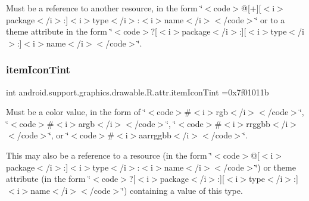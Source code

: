 Must be a reference to another resource, in the form \char`\"{}$<$code$>$@\mbox{[}+\mbox{]}\mbox{[}$<$i$>$package$<$/i$>$\+:\mbox{]}$<$i$>$type$<$/i$>$\+:$<$i$>$name$<$/i$>$$<$/code$>$\char`\"{} or to a theme attribute in the form \char`\"{}$<$code$>$?\mbox{[}$<$i$>$package$<$/i$>$\+:\mbox{]}\mbox{[}$<$i$>$type$<$/i$>$\+:\mbox{]}$<$i$>$name$<$/i$>$$<$/code$>$\char`\"{}. \mbox{\label{classandroid_1_1support_1_1graphics_1_1drawable_1_1R_1_1attr_a09810cf691cdb1d0ea29a12e2f0de04a}} 
\subsubsection{\texorpdfstring{item\+Icon\+Tint}{itemIconTint}}
{\footnotesize\ttfamily int android.\+support.\+graphics.\+drawable.\+R.\+attr.\+item\+Icon\+Tint =0x7f01011b\hspace{0.3cm}{\ttfamily [static]}}

Must be a color value, in the form of \char`\"{}$<$code$>$\#$<$i$>$rgb$<$/i$>$$<$/code$>$\char`\"{}, \char`\"{}$<$code$>$\#$<$i$>$argb$<$/i$>$$<$/code$>$\char`\"{}, \char`\"{}$<$code$>$\#$<$i$>$rrggbb$<$/i$>$$<$/code$>$\char`\"{}, or \char`\"{}$<$code$>$\#$<$i$>$aarrggbb$<$/i$>$$<$/code$>$\char`\"{}. 

This may also be a reference to a resource (in the form \char`\"{}$<$code$>$@\mbox{[}$<$i$>$package$<$/i$>$\+:\mbox{]}$<$i$>$type$<$/i$>$\+:$<$i$>$name$<$/i$>$$<$/code$>$\char`\"{}) or theme attribute (in the form \char`\"{}$<$code$>$?\mbox{[}$<$i$>$package$<$/i$>$\+:\mbox{]}\mbox{[}$<$i$>$type$<$/i$>$\+:\mbox{]}$<$i$>$name$<$/i$>$$<$/code$>$\char`\"{}) containing a value of this type. \mbox{\label{classandroid_1_1support_1_1graphics_1_1drawable_1_1R_1_1attr_ac1e93d0be06d113523f87e0b3b6d7810}} 
